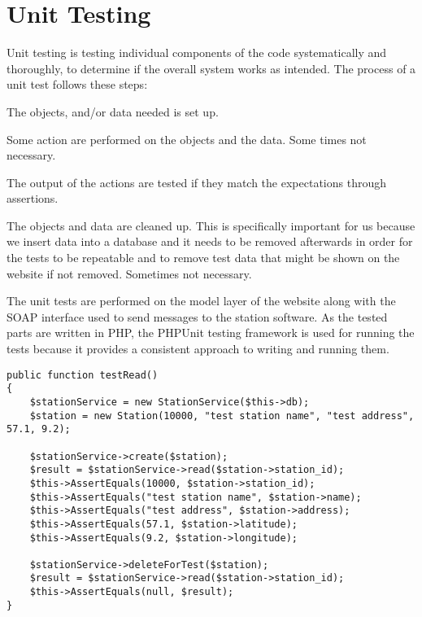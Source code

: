 \section{Unit Testing}
Unit testing is testing individual components of the code systematically and thoroughly, to determine if the overall system works as intended.
The process of a unit test follows these steps:

\begin{description}[style=nextline]
\item[Set Up] The objects, and/or data needed is set up.
\item[Action] Some action are performed on the objects and the data.
Some times not necessary.
\item[Test] The output of the actions are tested if they match the expectations through assertions.
\item[Tear Down/Clean Up] The objects and data are cleaned up. This is specifically important for us because we insert data into a database and it needs to be removed afterwards in order for the tests to be repeatable and to remove test data that might be shown on the website if not removed. 
Sometimes not necessary.
\end{description}

The unit tests are performed on the model layer of the website along with the SOAP interface used to send messages to the station software.
As the tested parts are written in PHP, the PHPUnit testing framework is used for running the tests because it provides a consistent approach to writing and running them.

\begin{lstlisting}[caption = {Example of a unit test}, label = {lst:unitTestExample}]
public function testRead()
{
	$stationService = new StationService($this->db);
	$station = new Station(10000, "test station name", "test address", 57.1, 9.2);

	$stationService->create($station);
	$result = $stationService->read($station->station_id);
	$this->AssertEquals(10000, $station->station_id);
	$this->AssertEquals("test station name", $station->name);
	$this->AssertEquals("test address", $station->address);
	$this->AssertEquals(57.1, $station->latitude);
	$this->AssertEquals(9.2, $station->longitude);

	$stationService->deleteForTest($station);
	$result = $stationService->read($station->station_id);
	$this->AssertEquals(null, $result);
}
\end{lstlisting}

